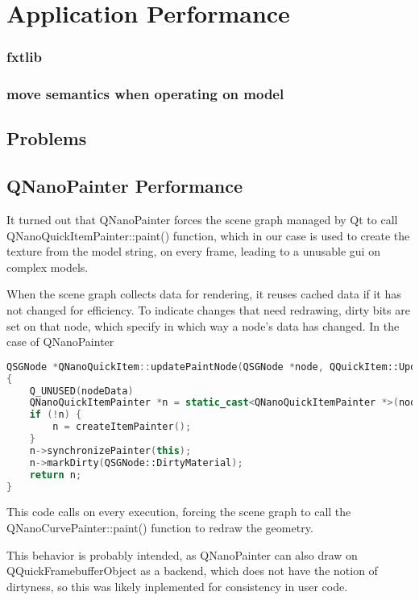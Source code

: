 \chapter{Application Performance}

\subsection{fxtlib}
\subsection{move semantics when operating on model}
\section{Problems}
\section{QNanoPainter Performance}
It turned out that QNanoPainter forces the scene graph managed by Qt to call QNanoQuickItemPainter::paint() function, which in our case is used to create the texture from the model string, on every frame, leading to a unusable \gls{gui} on complex models.

When the scene graph collects data for rendering, it reuses cached data if it has not changed for efficiency. To indicate changes that need redrawing, dirty bits are set on that node, which specify in which way a node's data has changed. In the case of QNanoPainter 

\begin{lstlisting}[language=c++,caption=QNanoQuickItem as of commit de45f31e]
QSGNode *QNanoQuickItem::updatePaintNode(QSGNode *node, QQuickItem::UpdatePaintNodeData *nodeData)
{
    Q_UNUSED(nodeData)
    QNanoQuickItemPainter *n = static_cast<QNanoQuickItemPainter *>(node);
    if (!n) {
        n = createItemPainter();
    }
    n->synchronizePainter(this);
    n->markDirty(QSGNode::DirtyMaterial);
    return n;
}
\end{lstlisting}
This code calls  on every execution, forcing the scene graph to call the QNanoCurvePainter::paint() function to redraw the geometry.

This behavior is probably intended, as QNanoPainter can also draw on QQuickFramebufferObject as a backend, which does not have the notion of dirtyness, so this was likely inplemented for consistency in user code.

